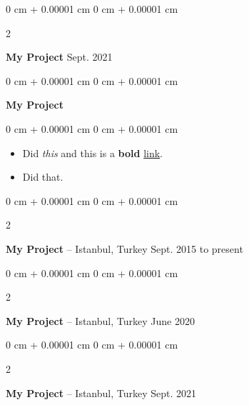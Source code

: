 \documentclass[10pt, letterpaper]{article}
\newenvironment{highlights}{
    \begin{itemize}[
        topsep=0.10 cm,
        parsep=0.10 cm,
        partopsep=0pt,
        itemsep=0pt,
        leftmargin=0 cm + 10pt
    ]
}{
    \end{itemize}
        
    \vspace{-0.10cm}
} %
\newenvironment{onecolentry}{
    \begin{adjustwidth}{
        0 cm + 0.00001 cm
    }{
        0 cm + 0.00001 cm
    }
}{
    \end{adjustwidth}
} %
\newenvironment{twocolentry}[2][]{
    \onecolentry
    \def\secondColumn{#2}
    \setcolumnwidth{\fill, 4.1 cm}
    \begin{paracol}{2}
}{
    \switchcolumn \raggedleft \secondColumn
    \end{paracol}
    \endonecolentry
} %
\begin{document}
        \vspace{0.10 cm}


        \vspace{0.15 cm}

        \begin{twocolentry}{
            Sept. 2021
        }
            \textbf{My Project}\end{twocolentry}

        \vspace{0.10 cm}


        \vspace{0.15 cm}

        \begin{onecolentry}
            \textbf{My Project}\end{onecolentry}

        \vspace{0.10 cm}
        \begin{onecolentry}
            \begin{highlights}
                \item Did \textit{this} and this is a \textbf{bold} \href{https://example.com}{link}.
                \item Did that.
            \end{highlights}
        \end{onecolentry}


        \vspace{0.15 cm}

        \begin{twocolentry}{
            Sept. 2015 to present
        }
            \textbf{My Project} -- Istanbul, Turkey\end{twocolentry}

        \vspace{0.10 cm}


        \vspace{0.15 cm}

        \begin{twocolentry}{
            June 2020
        }
            \textbf{My Project} -- Istanbul, Turkey\end{twocolentry}

        \vspace{0.10 cm}


        \vspace{0.15 cm}

        \begin{twocolentry}{
            Sept. 2021
        }
            \textbf{My Project} -- Istanbul, Turkey\end{twocolentry}
\end{document}
